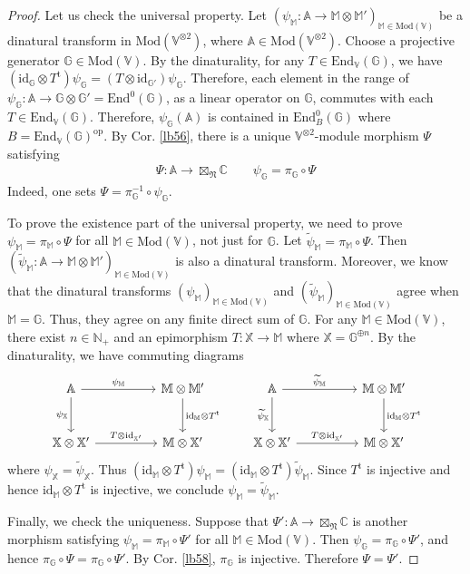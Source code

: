 \documentclass[11pt,b5paper,notitlepage]{article}
\theoremstyle{definition}
\theoremstyle{plain}
\newcommand{\wtd}{\widetilde}
\newcommand{\tr}{\mathrm{t}} %
\newcommand{\End}{\mathrm{End}} %
\newcommand{\opp}{\mathrm{op}}
\newcommand{\Vbb}{\mathbb V}
\newcommand{\Xbb}{\mathbb X}
\newcommand{\Mbb}{\mathbb M}
\newcommand{\Gbb}{\mathbb G}
\newcommand{\Cbb}{\mathbb C}
\newcommand{\Nbb}{\mathbb N}
\newcommand{\<}{\left\langle}
\renewcommand{\>}{\right\rangle}
\newcommand{\Mod}{\mathrm{Mod}}
\newcommand{\id}{\mathrm{id}}
\newcommand{\fn}{\mathfrak{N}}
\newcommand{\Abb}{{\mathbb{A}}}
\numberwithin{equation}{section}
\begin{document}
\begin{proof}
Let us check the universal property. Let $(\psi_\Mbb:\Abb \rightarrow \Mbb\otimes \Mbb')_{\Mbb\in\Mod(\Vbb)}$ be a dinatural transform in $\Mod(\Vbb^{\otimes 2})$, where $\Abb\in\Mod(\Vbb^{\otimes2})$. Choose a projective generator $\Gbb\in \Mod(\Vbb)$. By the dinaturality, for any $T\in\End_\Vbb(\Gbb)$, we have $(\id_\Gbb\otimes T^\tr)\psi_\Gbb=(T\otimes\id_{\Gbb'})\psi_\Gbb$. Therefore, each element in the range of $\psi_\Gbb:\Abb\rightarrow \Gbb\otimes \Gbb'=\End^0(\Gbb)$, as a linear operator on $\Gbb$, commutes with each $T\in\End_\Vbb(\Gbb)$. Therefore, $\psi_\Gbb(\Abb)$ is contained in $\End_B^0(\Gbb)$ where $B=\End_\Vbb(\Gbb)^\opp$. By Cor. \ref{lb56}, there is a unique $\Vbb^{\otimes2}$-module morphism $\Psi$ satisfying
\begin{align*}
\Psi:\Abb\rightarrow\boxtimes_\fn\Cbb\qquad\psi_\Gbb=\pi_\Gbb\circ\Psi
\end{align*}
Indeed, one sets $\Psi=\pi_\Gbb^{-1}\circ\psi_\Gbb$.

To prove the existence part of the universal property, we need to prove $\psi_\Mbb=\pi_\Mbb\circ\Psi$ for all $\Mbb\in \Mod(\Vbb)$, not just for $\Gbb$. Let $\wtd\psi_\Mbb=\pi_\Mbb\circ\Psi$. Then $(\wtd\psi_\Mbb:\Abb\rightarrow\Mbb\otimes\Mbb')_{\Mbb\in\Mod(\Vbb)}$ is also a dinatural transform. Moreover, we know that the dinatural transforms $(\psi_\Mbb)_{\Mbb\in\Mod(\Vbb)}$ and $(\wtd\psi_\Mbb)_{\Mbb\in\Mod(\Vbb)}$ agree when $\Mbb=\Gbb$. Thus, they agree on any finite direct sum of $\Gbb$. For any $\Mbb\in\Mod(\Vbb)$, there exist $n\in\Nbb_+$ and an epimorphism $T:\Xbb\rightarrow\Mbb$ where $\Xbb=\Gbb^{\oplus n}$. By the dinaturality, we have commuting diagrams
\begin{equation*}
	\begin{tikzcd}[row sep=large, column sep=huge]
\Abb \arrow[r,"{\psi_\Mbb}"] \arrow[d,"{\psi_\Xbb}"'] & \Mbb\otimes\Mbb' \arrow[d,"{\id_\Mbb\otimes T^\tr}"] \\
\Xbb\otimes\Xbb' \arrow[r,"{T\otimes\id_{\Xbb'}}"]           & \Mbb\otimes\Xbb'   
	\end{tikzcd}
\qquad
	\begin{tikzcd}[row sep=large, column sep=huge]
\Abb \arrow[r,"{\wtd\psi_\Mbb}"] \arrow[d,"{\wtd\psi_\Xbb}"'] & \Mbb\otimes\Mbb' \arrow[d,"{\id_\Mbb\otimes T^\tr}"] \\
\Xbb\otimes\Xbb' \arrow[r,"{T\otimes\id_{\Xbb'}}"]           & \Mbb\otimes\Xbb'   
	\end{tikzcd}
\end{equation*}
where $\psi_\Xbb=\wtd\psi_\Xbb$. Thus $(\id_\Mbb\otimes T^\tr)\psi_\Mbb=(\id_\Mbb\otimes T^\tr)\wtd\psi_\Mbb$. Since $T^\tr$ is injective and hence $\id_\Mbb\otimes T^\tr$ is injective, we conclude $\psi_\Mbb=\wtd\psi_\Mbb$.


Finally, we check the uniqueness. Suppose that $\Psi':\Abb\rightarrow\boxtimes_\fn\Cbb$ is another morphism satisfying $\psi_\Mbb=\pi_\Mbb\circ\Psi'$ for all $\Mbb\in\Mod(\Vbb)$. Then $\psi_\Gbb=\pi_\Gbb\circ\Psi'$, and hence $\pi_\Gbb\circ\Psi=\pi_\Gbb\circ\Psi'$. By Cor. \ref{lb58}, $\pi_\Gbb$ is injective. Therefore $\Psi=\Psi'$.
\end{proof}
\end{document}
